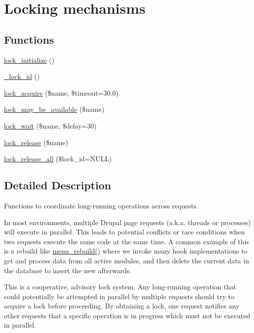 \hypertarget{group__lock}{
\section{Locking mechanisms}
\label{group__lock}
}
\subsection*{Functions}
\begin{DoxyCompactItemize}
\item 
\hyperlink{group__lock_ga8e0cf09d86196c0a26b50df3567108a4}{lock\_\-initialize} ()
\item 
\hyperlink{group__lock_ga22f64c6b65bc54d5f8f981559b0cdf04}{\_\-lock\_\-id} ()
\item 
\hyperlink{group__lock_gac67a4b1061491f7a869646f47b66e998}{lock\_\-acquire} (\$name, \$timeout=30.0)
\item 
\hyperlink{group__lock_ga095b65838e63b109f52ff6d8c00d8963}{lock\_\-may\_\-be\_\-available} (\$name)
\item 
\hyperlink{group__lock_ga54c2ee771edac47614b8f12d949d3376}{lock\_\-wait} (\$name, \$delay=30)
\item 
\hyperlink{group__lock_ga73e1456861f9aff1a506a650f43aceb0}{lock\_\-release} (\$name)
\item 
\hyperlink{group__lock_ga290817e14e2a9ecc0bd34c6b7b0af031}{lock\_\-release\_\-all} (\$lock\_\-id=NULL)
\end{DoxyCompactItemize}


\subsection{Detailed Description}
Functions to coordinate long-\/running operations across requests.

In most environments, multiple Drupal page requests (a.k.a. threads or processes) will execute in parallel. This leads to potential conflicts or race conditions when two requests execute the same code at the same time. A common example of this is a rebuild like \hyperlink{group__menu_gaf36dcb9d5491ef5e7d2cf22c1f5c69f4}{menu\_\-rebuild()} where we invoke many hook implementations to get and process data from all active modules, and then delete the current data in the database to insert the new afterwards.

This is a cooperative, advisory lock system. Any long-\/running operation that could potentially be attempted in parallel by multiple requests should try to acquire a lock before proceeding. By obtaining a lock, one request notifies any other requests that a specific operation is in progress which must not be executed in parallel.

